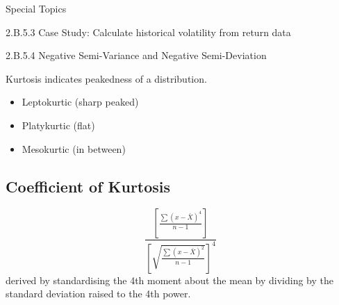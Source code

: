 Special Topics

2.B.5.3 Case Study:  Calculate historical volatility from return data

2.B.5.4 Negative Semi-Variance and Negative Semi-Deviation



Kurtosis
indicates peakedness of a distribution.
\begin{itemize}
\item Leptokurtic (sharp peaked)
\item Platykurtic (flat)
\item Mesokurtic (in between)
\end{itemize}

\subsection*{Coefficient of Kurtosis}
\[
\frac{\left[ \frac{\sum(x-\bar{X})^4}{n-1} \right]}{\left[ \sqrt{\frac{\sum(x-\bar{X})^2}{n-1}} \right]^4}
\]
derived by standardising the 4th moment about the mean by dividing by the standard deviation raised to the 4th power.



